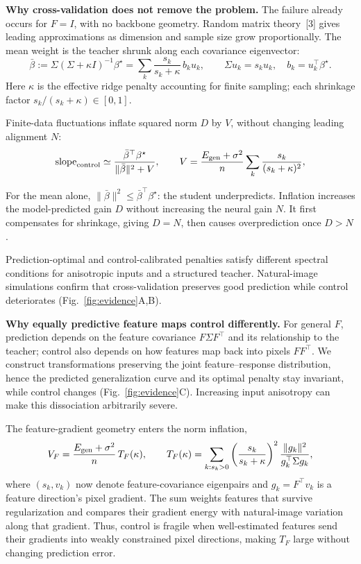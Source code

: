 \documentclass[12pt,a4paper]{article}
\newcommand{\head}[1]{\par\noindent\textbf{#1}\enspace\ignorespaces}
\newcommand{\bt}{\beta^\star}
\newcommand{\mb}{\bar\beta}
\begin{document}
\head{Why cross-validation does not remove the problem.}
The failure already occurs for $F=I$, with no backbone geometry. Random matrix theory~[3] gives leading approximations as dimension and sample size grow proportionally. The mean weight is the teacher shrunk along each covariance eigenvector:
\begin{equation}
\mb:=\Sigma(\Sigma+\kappa I)^{-1}\bt
=\sum_k\frac{s_k}{s_k+\kappa}\,b_k u_k,
\qquad \Sigma u_k=s_k u_k,\quad b_k=u_k^\top\bt.
\label{eq:mean-shrinkage}
\end{equation}
Here $\kappa$ is the effective ridge penalty accounting for finite sampling; each shrinkage factor $s_k/(s_k+\kappa)\in[0,1]$.\par
Finite-data fluctuations inflate squared norm $D$ by $V$, without changing leading alignment $N$:
\begin{equation}
\mathrm{slope}_{\rm control}\simeq
\frac{\mb^\top\bt}{\|\mb\|^2+V},
\qquad
V=\frac{E_{\rm gen}+\sigma^2}{n}
\sum_k\frac{s_k}{(s_k+\kappa)^2},
\label{eq:inflation}
\end{equation}\par
For the mean alone, $\|\mb\|^2\le\mb^\top\bt$: the student underpredicts. Inflation increases the model-predicted gain $D$ without increasing the neural gain $N$. It first compensates for shrinkage, giving $D=N$, then causes overprediction once $D>N$.\par
Prediction-optimal and control-calibrated penalties satisfy different spectral conditions for anisotropic inputs and a structured teacher. Natural-image simulations confirm that cross-validation preserves good prediction while control deteriorates (Fig.~\ref{fig:evidence}A,B).\par

\head{Why equally predictive feature maps control differently.}
For general $F$, prediction depends on the feature covariance $F\Sigma F^\top$ and its relationship to the teacher; control also depends on how features map back into pixels $FF^\top$. We construct transformations preserving the joint feature--response distribution, hence the predicted generalization curve and its optimal penalty stay invariant, while control changes (Fig.~\ref{fig:evidence}C). Increasing input anisotropy can make this dissociation arbitrarily severe.

The feature-gradient geometry enters the norm inflation, 
\begin{equation}
V_F=\frac{E_{\rm gen}+\sigma^2}{n}\,T_F(\kappa),
\qquad
T_F(\kappa)=\sum_{k:s_k>0}
\left(\frac{s_k}{s_k+\kappa}\right)^2
\frac{\|g_k\|^2}{g_k^\top\Sigma g_k},
\label{eq:features}
\end{equation}
where $(s_k,v_k)$ now denote feature-covariance eigenpairs and $g_k=F^\top v_k$ is a feature direction's pixel gradient. The sum weights features that survive regularization and compares their gradient energy with natural-image variation along that gradient. Thus, control is fragile when well-estimated features send their gradients into weakly constrained pixel directions, making $T_F$ large without changing prediction error.
\end{document}
